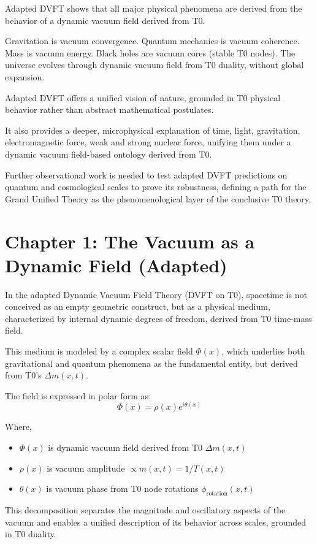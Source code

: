 \documentclass[12pt,a4paper]{article}
\begin{document}
	Adapted DVFT shows that all major physical phenomena are derived from the behavior of a dynamic vacuum field derived from T0.
	
	Gravitation is vacuum convergence.
	Quantum mechanics is vacuum coherence.
	Mass is vacuum energy.
	Black holes are vacuum cores (stable T0 nodes).
	The universe evolves through dynamic vacuum field from T0 duality, without global expansion.
	
	Adapted DVFT offers a unified vision of nature, grounded in T0 physical behavior rather than abstract mathematical postulates.
	
	It also provides a deeper, microphysical explanation of time, light, gravitation, electromagnetic force, weak and strong nuclear force, unifying them under a dynamic vacuum field-based ontology derived from T0.
	
	Further observational work is needed to test adapted DVFT predictions on quantum and cosmological scales to prove its robustness, defining a path for the Grand Unified Theory as the phenomenological layer of the conclusive T0 theory.
	
	\section{Chapter 1: The Vacuum as a Dynamic Field (Adapted)}
	
	In the adapted Dynamic Vacuum Field Theory (DVFT on T0), spacetime is not conceived as an empty geometric construct, but as a physical medium, characterized by internal dynamic degrees of freedom, derived from T0 time-mass field.
	
	This medium is modeled by a complex scalar field $\Phi(x)$, which underlies both gravitational and quantum phenomena as the fundamental entity, but derived from T0's $\Delta m(x,t)$.
	
	The field is expressed in polar form as:
	\[
	\Phi(x)=\rho(x)e^{i\theta(x)}
	\]
	
	Where,
	\begin{itemize}
		\item $\Phi(x)$ is dynamic vacuum field derived from T0 $\Delta m(x,t)$
		\item $\rho(x)$ is vacuum amplitude $\propto m(x,t) = 1/T(x,t)$
		\item $\theta(x)$ is vacuum phase from T0 node rotations $\phi_{\text{rotation}}(x,t)$
	\end{itemize}
	
	This decomposition separates the magnitude and oscillatory aspects of the vacuum and enables a unified description of its behavior across scales, grounded in T0 duality.
	
\end{document}
